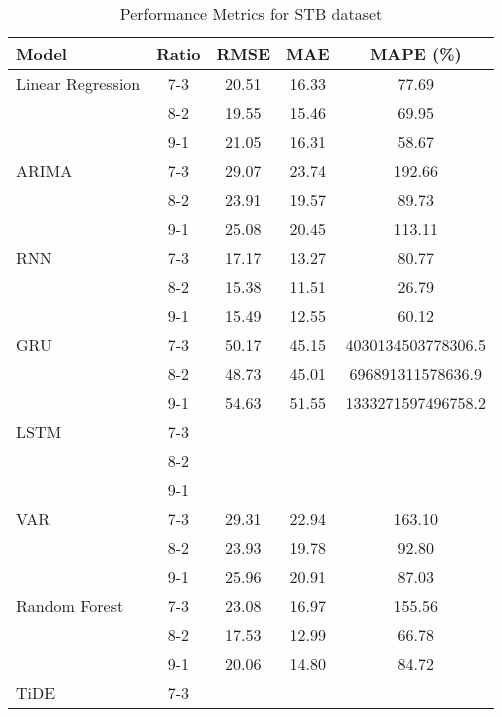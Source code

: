 \begin{table}[h!]
    \centering
    \caption{Performance Metrics for STB dataset}
    \begin{tabular}{|l|c|c|c|c|}
    \hline
    \rowcolor{orange!30} \textbf{Model} & \textbf{Ratio} & \textbf{RMSE} & \textbf{MAE} & \textbf{MAPE (\%)} \\ \hline
    \rowcolor{white} Linear Regression & 7-3 & 20.51 & 16.33 & 77.69 \\ \hline
    \rowcolor{white}  & 8-2 & 19.55 & 15.46 & 69.95 \\ \hline
    \rowcolor{white}  & 9-1 & 21.05 & 16.31 & 58.67 \\ \hline
    \rowcolor{white} ARIMA & 7-3 & 29.07 & 23.74 & 192.66 \\ \hline
    \rowcolor{white}  & 8-2 & 23.91 & 19.57 & 89.73 \\ \hline
    \rowcolor{white}  & 9-1 & 25.08 & 20.45 & 113.11 \\ \hline
    \rowcolor{white} RNN & 7-3 & 17.17 & 13.27 & 80.77 \\ \hline
    \rowcolor{white}  & 8-2 & 15.38 & 11.51 & 26.79 \\ \hline
    \rowcolor{white}  & 9-1 & 15.49 & 12.55 & 60.12 \\ \hline
    \rowcolor{white} GRU & 7-3 & 50.17 & 45.15 & 4030134503778306.5 \\ \hline
    \rowcolor{white}  & 8-2 & 48.73 & 45.01 & 696891311578636.9 \\ \hline
    \rowcolor{white}  & 9-1 & 54.63 & 51.55 & 1333271597496758.2\\ \hline
    \rowcolor{white} LSTM & 7-3 &  &  &  \\ \hline
    \rowcolor{white}  & 8-2 &  &  &  \\ \hline
    \rowcolor{white}  & 9-1 &  &  &  \\ \hline
    \rowcolor{white} VAR & 7-3 & 29.31 & 22.94 & 163.10 \\ \hline
    \rowcolor{white}  & 8-2 & 23.93 & 19.78 & 92.80 \\ \hline
    \rowcolor{white}  & 9-1 & 25.96 & 20.91 & 87.03 \\ \hline
    \rowcolor{white} Random Forest & 7-3 & 23.08 & 16.97 & 155.56 \\ \hline
    \rowcolor{white}  & 8-2 & 17.53 & 12.99 & 66.78 \\ \hline
    \rowcolor{white}  & 9-1 & 20.06 & 14.80 & 84.72 \\ \hline
    \rowcolor{green!30} TiDE & 7-3 &  &  &  \\ \hline

\end{tabular}
\end{table}
